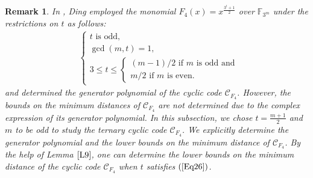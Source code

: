 \documentclass[pdflatex,sn-mathphys-num]{sn-jnl}%
\theoremstyle{thmstyleone}%
\theoremstyle{thmstyletwo}%
\newtheorem{remark}{Remark}%
\theoremstyle{thmstylethree}%
\begin{document}
\begin{remark}
    In \textnormal{\cite[Section $5.4$]{P3}}, Ding employed the monomial $F_{4}(x)=x^{\frac{3^{t}+1}{2}}$ over $\mathbb{F}_{3^m}$ under the restrictions on $t$ as follows:
    \begin{align}\label{Eq26}
        &\begin{cases}
            \text{$t$ is odd}, \\
            \operatorname{gcd}(m,t)=1, \\
            3\leq t\leq \begin{cases}
                (m-1)/2\text{ if $m$ is odd and} \\
                m/2\text{ if $m$ is even.}
            \end{cases}
        \end{cases}
    \end{align}
    and determined the generator polynomial of the cyclic code $\mathcal{C}_{F_{4}}$. However, the bounds on the minimum distances of $\mathcal{C}_{F_{4}}$ are not determined due to the complex expression of its generator polynomial. In this subsection, we chose $t=\frac{m+1}{2}$ and $m$ to be odd to study the ternary cyclic code $\mathcal{C}_{F_{4}}$. We explicitly determine the generator polynomial and the lower bounds on the minimum distance of $\mathcal{C}_{F_{4}}$. By the help of Lemma $\ref{L9}$, one can determine the lower bounds on the minimum distance of the cyclic code $\mathcal{C}_{F_{4}}$ when $t$ satisfies $(\ref{Eq26})$.  
\end{remark}
\end{document}
